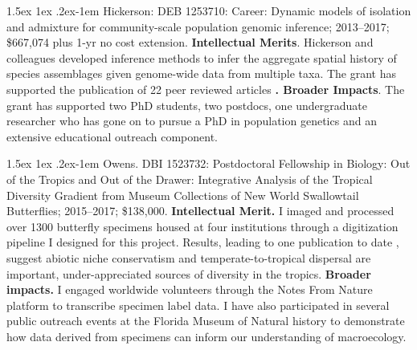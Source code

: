 \documentclass[11pt]{article}
\makeatletter
\renewcommand{\paragraph}{\@startsection{paragraph}{4}{\z@}
  {1.5ex \@plus 1ex \@minus .2ex}{-1em}
  {\normalfont\normalsize\it}
}
\makeatother
\begin{document}
\paragraph{Hickerson}: DEB 1253710: Career: Dynamic models of isolation and
admixture for community-scale population genomic inference; 2013--2017;
\$667,074 plus 1-yr no cost extension. \textbf{Intellectual Merits}.
Hickerson and colleagues developed inference methods to infer the
aggregate spatial history of species assemblages given genome-wide data
from multiple taxa. The grant has supported the publication of 22 peer
reviewed articles
\cite{Overcast2017-mf,Xue2017-hn,Emerson2015-tt,Myers2016-xu,Boehm2016-vu,Joseph2016-iu,Burbrink2016-ac,Brown2016-th,Prates2016-xv,Demos2015-px,Lipshutz2017-qq,Harris2016-oh,Alvarado-Serrano2015-zg,Xue2015-el,Emerson2015-xs,Boehm2015-ze,Robinson2014-ve,Robinson2014-vy,Smith2014-tb,Chan2014-nq,Demos2014-eu,Hickerson2014-za}\textbf{.
Broader Impacts}. The grant has supported two PhD students, two
postdocs, one undergraduate researcher who has gone on to pursue a PhD
in population genetics and an extensive educational outreach component.

\paragraph{Owens. }DBI 1523732: Postdoctoral Fellowship in Biology: Out of
the Tropics and Out of the Drawer: Integrative Analysis of the Tropical
Diversity Gradient from Museum Collections of New World Swallowtail
Butterflies; 2015--2017; \$138,000. \textbf{Intellectual Merit. }I
imaged and processed over 1300 butterfly specimens housed at four
institutions through a digitization pipeline I designed for this
project. Results, leading to one publication to date
\cite{Owens2017-ja}, suggest abiotic niche conservatism and
temperate-to-tropical dispersal are important, under-appreciated sources
of diversity in the tropics. \textbf{Broader impacts. }I engaged
worldwide volunteers through the Notes From Nature platform to
transcribe specimen label data. I have also participated in several
public outreach events at the Florida Museum of Natural history to
demonstrate how data derived from specimens can inform our understanding
of macroecology.
\end{document}
